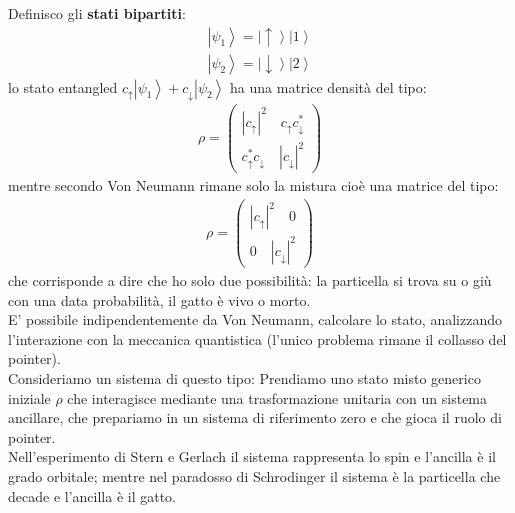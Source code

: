 Definisco gli \textbf{stati bipartiti}:
\begin{equation}\begin{split}
\left|\psi_{1}\right\rangle=\left|\uparrow\right\rangle \left|1\right\rangle
\end{split}\end{equation}
\begin{equation}\begin{split}
\left|\psi_{2}\right\rangle=\left|\downarrow\right\rangle \left|2\right\rangle
\end{split}\end{equation}
lo stato entangled $c_{\uparrow}\left|\psi_{1}\right\rangle + c_{\downarrow}\left|\psi_{2}\right\rangle$ ha una matrice densità del tipo:\\
\begin{equation}\begin{split}
\rho=
\left(\begin{matrix}
\left|c_{\uparrow}\right|^2\quad c_{\uparrow}c_{\downarrow}^* \\
c_{\uparrow}^*c_{\downarrow} \quad \left|c_{\downarrow}\right|^2
\end{matrix}\right)
\end{split}\end{equation}
mentre secondo Von Neumann rimane solo la mistura cioè una matrice del tipo:
\begin{equation}\begin{split}
\rho=
\left(\begin{matrix}
\left|c_{\uparrow}\right|^2\quad 0 \\
0 \quad \left|c_{\downarrow}\right|^2
\end{matrix}\right)
\end{split}\end{equation}
che corrisponde a dire che ho solo due possibilità: la particella si trova su o giù con una data probabilità, il gatto è vivo o morto.\\
E' possibile indipendentemente da Von Neumann, calcolare lo stato, analizzando l'interazione con la meccanica quantistica (l'unico problema rimane il collasso del pointer).\\
Consideriamo un sistema di questo tipo:
Prendiamo uno stato misto generico iniziale $\rho$  che interagisce mediante una trasformazione unitaria con un sistema ancillare, che prepariamo in un sistema di riferimento zero e che gioca il ruolo di pointer.\\
Nell'esperimento di Stern e Gerlach il sistema rappresenta lo spin e l'ancilla è il grado orbitale; mentre nel paradosso di Schrodinger il sistema è la particella che decade e l'ancilla è il gatto.\\
